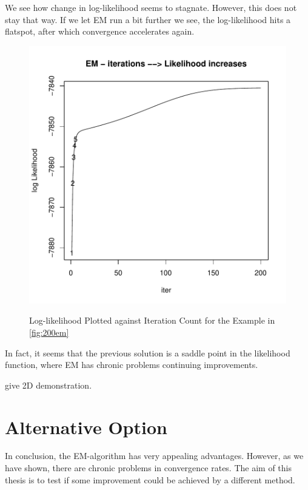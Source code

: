 We see how change in log-likelihood seems to stagnate. However, this does not 
stay that way. If we let EM run a bit further we see, the log-likelihood hits 
a flatspot, after which convergence accelerates again.


\begin{figure}[h]
    \centering
\includegraphics{chapter1-figemll}
    \label{fig:emll}
    \caption{Log-likelihood Plotted against Iteration Count for the Example in \ref{fig:200em}}
\end{figure}



In fact, it seems that the previous solution is a saddle point in the likelihood
function, where EM has chronic problems continuing improvements.

give 2D demonstration.


\section{Alternative Option}
\label{sec:alt}


In conclusion, the EM-algorithm has very appealing advantages. However, as we
have shown, there are chronic problems in convergence rates. The aim of this 
thesis is to test if some improvement could be achieved by a different method.

